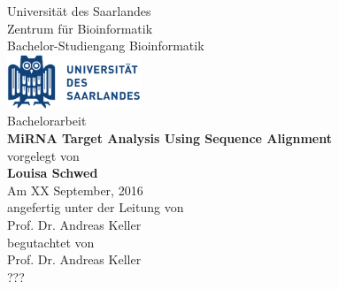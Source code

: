 \documentclass[12pt]{article}
\begin{document}
\def\supervisorIname{Advisor I}
\def\supervisorIIname{Second Reviewer}

	\def\university{Universit\"{a}t des Saarlandes}
	\def\institute{Center for Bioinformatics}
	\def\chair{Bachelor-Studiengang Bioinformatik }
	\def\projectname{MiRNA Target Analysis Using Sequence Alignment}
	\vspace{.2em}  
	\def\author{Louisa Schwed}
	\def\date{September 2016}

\begin{titlepage}

  \begin{minipage}{\textwidth}
    \begin{center}
    { \large Universit\"{a}t des Saarlandes \\ Zentrum f\"{u}r Bioinformatik\\ Bachelor-Studiengang Bioinformatik \\}
	\vspace{0.5cm}
    \includegraphics[width=4cm]{Logo-Universitaet_des_Saarlandes.pdf}\\
    \vspace{1.5cm}
    { \large Bachelorarbeit\\}
    \vspace{0.5cm}
    {\huge\textbf{\projectname}}\\
    \vspace{1.5cm}
    { \large vorgelegt von}\\
	\vspace{0.5cm}
    {\large\textbf{\author}}\\
    \vspace{0.5cm}
    {\large Am XX September, 2016}\\
    \vspace{1.5cm}
    {\large angefertig unter der Leitung von}\\
    \vspace{0.5cm}
    {\large Prof. Dr. Andreas Keller}\\
    \vspace{1.5cm}
    {\large begutachtet von}\\
    \vspace{0.5cm}
    {\large Prof. Dr. Andreas Keller}\\
   	{\large ???}\\
    \vspace{0.5cm}
    \end{center}
  \end{minipage}   
   

\end{titlepage}
\end{document}
